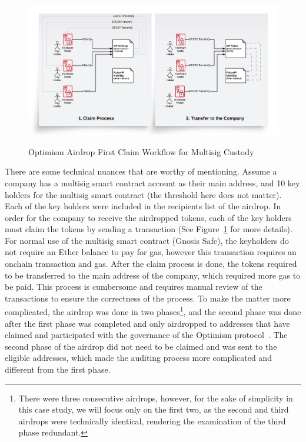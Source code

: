 \begin{figure}[h]
    \centering
{\caption[Optimism Airdrop First Claim Workflow]{Optimism Airdrop First Claim Workflow for Multisig Custody}\label{fig:opairdrop}}
{\includegraphics[width=1\textwidth]{figures/BlockchainAudit-OPAirdrop.png}}
\end{figure}
%

There are some technical nuances that are worthy of mentioning. Assume a company has a multisig smart contract account as their main address, and 10 key holders for the multisig smart contract (the threshold here does not matter). Each of the key holders were included in the recipients list of the airdrop. In order for the company to receive the airdropped tokens, each of the key holders must claim the tokens by sending a transaction (See Figure~\ref{fig:opairdrop} for more details). For normal use of the multisig smart contract (\eg Gnosis Safe), the keyholders do not require an Ether balance to pay for gas, however this transaction requires an onchain transaction and gas. After the claim process is done, the tokens required to be transferred to the main address of the company, which required more gas to be paid. This process is cumbersome and requires manual review of the transactions to ensure the correctness of the process. To make the matter more complicated, the airdrop was done in two phases\footnote{There were three consecutive airdrops, however, for the sake of simplicity in this case study, we will focus only on the first two, as the second and third airdrops were technically identical, rendering the examination of the third phase redundant.}, and the second phase was done after the first phase was completed and only airdropped to addresses that have claimed and participated with the governance of the Optimism protocol~\cite{allen2023airdrop}. The second phase of the airdrop did not need to be claimed and was sent to the eligible addresses, which made the auditing process more complicated and different from the first phase. 

